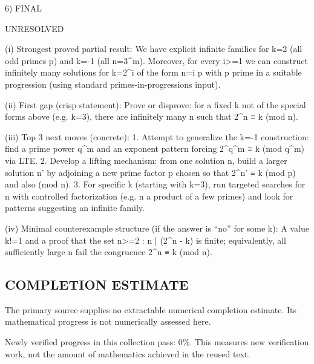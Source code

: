 6) FINAL

UNRESOLVED

(i) Strongest proved partial result:
We have explicit infinite families for k=2 (all odd primes p) and k=-1 (all n=3^m). Moreover, for every i>=1 we can construct infinitely many solutions for k=2^i of the form n=i p with p prime in a suitable progression (using standard primes-in-progressions input).

(ii) First gap (crisp statement):
Prove or disprove: for a fixed k not of the special forms above (e.g. k=3), there are infinitely many n such that 2^n ≡ k (mod n).

(iii) Top 3 next moves (concrete):
1. Attempt to generalize the k=-1 construction: find a prime power q^m and an exponent pattern forcing 2^{q^m} ≡ k (mod q^m) via LTE.
2. Develop a lifting mechanism: from one solution n, build a larger solution n' by adjoining a new prime factor p chosen so that 2^{n'} ≡ k (mod p) and also (mod n).
3. For specific k (starting with k=3), run targeted searches for n with controlled factorization (e.g. n a product of a few primes) and look for patterns suggesting an infinite family.

(iv) Minimal counterexample structure (if the answer is “no” for some k):
A value k!=1 and a proof that the set { n>=2 : n | (2^n - k) } is finite; equivalently, all sufficiently large n fail the congruence 2^n ≡ k (mod n).



\subsection*{COMPLETION ESTIMATE}
The primary source supplies no extractable numerical completion estimate. Its mathematical progress is not numerically assessed here.

Newly verified progress in this collection pass: $0\%$. This measures new verification work, not the amount of mathematics achieved in the reused text.
